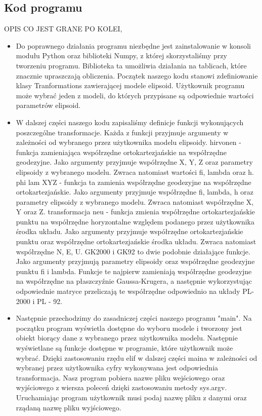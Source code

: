 \documentclass[10pt,a4paper]{article}
\begin{document}
\subsection{Kod programu}
OPIS CO JEST GRANE PO KOLEI, 
\begin{itemize}
	\item Do poprawnego działania programu niezbędne jest zainstalowanie w konsoli modułu Python oraz biblioteki Numpy, z której skorzystaliśmy przy tworzeniu programu. Biblioteka ta umożliwia działania na tablicach, które znacznie upraszczają obliczenia. Początek naszego kodu stanowi zdefiniowanie klasy Tranformations zawierającej modele elipsoid. Użytkownik programu może wybrać jeden z modeli, do których przypisane są odpowiednie wartości parametrów elipsoid.
	\item W dalszej części naszego kodu zapisaliśmy definicje funkcji wykonujących poszczególne transformacje. Każda z funkcji przyjmuje argumenty w zależności od wybranego przez użytkownika modelu elipsoidy. \newline
	hirvonen - funkcja zamieniająca współrzędne ortokartezjańskie na współrzędne geodezyjne. Jako argumenty przyjmuje współrzędne X, Y, Z oraz parametry elipsoidy z wybranego modelu. Zwraca natomiast wartości fi, lambda oraz h.\newline
	phi lam XYZ - funkcja ta zamienia współrzędne geodezyjne na współrzędne ortokartezjańskie. Jako argumenty przyjmuje współrzędne fi, lambda, h oraz parametry elipsoidy z wybranego modelu. Zwraca natomiast współrzędne X, Y oraz Z.\newline
	transformacja neu - funkcja zmienia współrzędne ortokartezjańskie punktu na współrzędne horyzontalne względem podanego przez użytkownika środka układu. Jako argumenty przyjmuje współrzędne ortokartezjańskie punktu oraz współrzędne ortokartezjańskie środka układu. Zwraca natomiast współrzędne N, E, U.\newline
	GK2000 i GK92 to dwie podobnie działające funkcje. Jako argumenty przyjmują parametry elipsoidy oraz współrzędne geodezyjne punktu fi i lambda. Funkcje te najpierw zamieniają współrzędne geodezyjne na współrzędne na płaszczyźnie Gaussa-Krugera, a następnie wykorzystując odpowiednie matryce przeliczają te współrzędne odpowiednio na układy PL- 2000 i PL - 92.
	\item Następnie przechodzimy do zasadniczej części naszego programu "main". Na początku program wyświetla dostępne do wyboru modele i tworzony jest obiekt biorący dane z wybranego przez użytkownika modelu. Następnie wyświetlane są funkcje dostępne w programie, które użytkownik może wybrać. Dzięki zastosowaniu rzędu elif w dalszej części maina w zależności od wybranej przez użytkownika cyfry wykonywana jest odpowiednia transformacja. Nasz program pobiera nazwe pliku wejściowego oraz wyjściowego z wiersza poleceń dzięki zastosowaniu metody sys.argv. Uruchamiając program użytkownik musi podaj nazwę pliku z danymi oraz rządaną nazwę pliku wyjściowego.\newline

\end{itemize}
\end{document}

